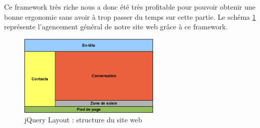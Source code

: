 Ce framework très riche nous a donc été très profitable pour pouvoir obtenir une bonne ergonomie sans avoir
à trop passer du temps sur cette partie.
Le schéma \ref{siteWeb_jQueryLayout} représente l'agencement général de notre site web grâce à ce framework.

\begin{figure}[!h]
	\center
	\includegraphics[width=0.6\textwidth]{img/siteWeb_jQueryLayout.png}
	\caption{jQuery Layout : structure du site web}
	\label{siteWeb_jQueryLayout}
\end{figure}
